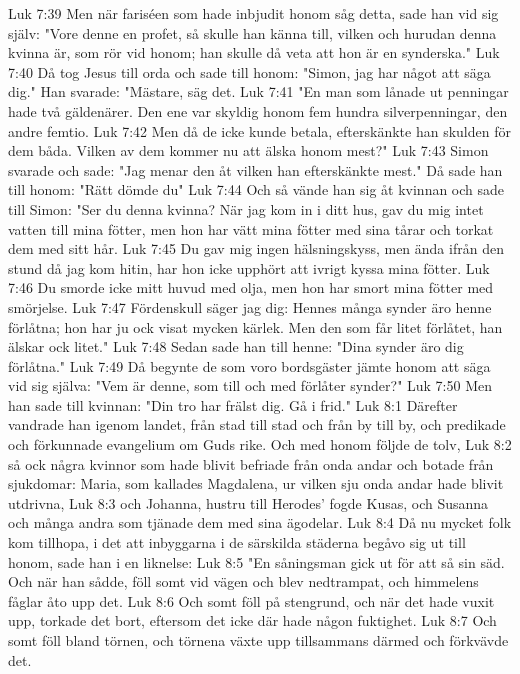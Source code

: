 Luk 7:39  Men när fariséen som hade inbjudit honom såg detta, sade han vid sig själv: "Vore denne en profet, så skulle han känna till, vilken och hurudan denna kvinna är, som rör vid honom; han skulle då veta att hon är en synderska."
Luk 7:40  Då tog Jesus till orda och sade till honom: "Simon, jag har något att säga dig." Han svarade: "Mästare, säg det.
Luk 7:41  "En man som lånade ut penningar hade två gäldenärer. Den ene var skyldig honom fem hundra silverpenningar, den andre femtio.
Luk 7:42  Men då de icke kunde betala, efterskänkte han skulden för dem båda. Vilken av dem kommer nu att älska honom mest?"
Luk 7:43  Simon svarade och sade: "Jag menar den åt vilken han efterskänkte mest." Då sade han till honom: "Rätt dömde du"
Luk 7:44  Och så vände han sig åt kvinnan och sade till Simon: "Ser du denna kvinna? När jag kom in i ditt hus, gav du mig intet vatten till mina fötter, men hon har vätt mina fötter med sina tårar och torkat dem med sitt hår.
Luk 7:45  Du gav mig ingen hälsningskyss, men ända ifrån den stund då jag kom hitin, har hon icke upphört att ivrigt kyssa mina fötter.
Luk 7:46  Du smorde icke mitt huvud med olja, men hon har smort mina fötter med smörjelse.
Luk 7:47  Fördenskull säger jag dig: Hennes många synder äro henne förlåtna; hon har ju ock visat mycken kärlek. Men den som får litet förlåtet, han älskar ock litet."
Luk 7:48  Sedan sade han till henne: "Dina synder äro dig förlåtna."
Luk 7:49  Då begynte de som voro bordsgäster jämte honom att säga vid sig själva: "Vem är denne, som till och med förlåter synder?"
Luk 7:50  Men han sade till kvinnan: "Din tro har frälst dig. Gå i frid."
Luk 8:1  Därefter vandrade han igenom landet, från stad till stad och från by till by, och predikade och förkunnade evangelium om Guds rike. Och med honom följde de tolv,
Luk 8:2  så ock några kvinnor som hade blivit befriade från onda andar och botade från sjukdomar: Maria, som kallades Magdalena, ur vilken sju onda andar hade blivit utdrivna,
Luk 8:3  och Johanna, hustru till Herodes' fogde Kusas, och Susanna och många andra som tjänade dem med sina ägodelar.
Luk 8:4  Då nu mycket folk kom tillhopa, i det att inbyggarna i de särskilda städerna begåvo sig ut till honom, sade han i en liknelse:
Luk 8:5  "En såningsman gick ut för att så sin säd. Och när han sådde, föll somt vid vägen och blev nedtrampat, och himmelens fåglar åto upp det.
Luk 8:6  Och somt föll på stengrund, och när det hade vuxit upp, torkade det bort, eftersom det icke där hade någon fuktighet.
Luk 8:7  Och somt föll bland törnen, och törnena växte upp tillsammans därmed och förkvävde det.
